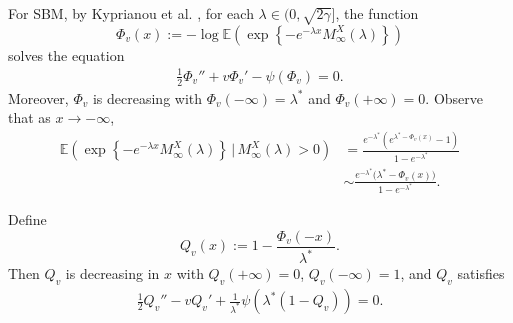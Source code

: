 \documentclass[11pt]{article}
\numberwithin{equation}{section}
\begin{document}
For SBM, by Kyprianou et al. \cite{KLMR12}, for each $\lambda \in (0, \sqrt{2\gamma}]$, the function
\[
\Phi_v(x) := -\log \mathbb{E}\left(\exp\left\{-e^{-\lambda x} M_\infty^X(\lambda)\right\}\right)
\]
solves the equation
\begin{align*}
	\frac{1}{2}\Phi_v'' + v \Phi_v' - \psi(\Phi_v) = 0.
\end{align*}
Moreover, $\Phi_v$ is decreasing with $\Phi_v(-\infty) = \lambda^*$ and $\Phi_v(+\infty) = 0$. 
Observe that as $x \to -\infty$, 
\begin{align}\label{Laplace-SBM}
	\mathbb{E}
	\left(\exp\left\{-e^{-\lambda x} M_\infty^X(\lambda)\right\} \,\Big|\, M_\infty^X(\lambda) > 0\right)
	& = \frac{e^{-\lambda^*}\left(e^{\lambda^* - \Phi_v(x)} - 1\right)}{1 - e^{-\lambda^*}} \nonumber\\
	&\sim \frac{e^{-\lambda^*}\bigl(\lambda^* - \Phi_v(x)\bigr)}{1 - e^{-\lambda^*}}
	.
\end{align}

Define
\[
Q_v(x) := 1 - \frac{\Phi_v(-x)}{\lambda^*}
.
\]
Then
 $Q_v$ is decreasing in $x$ with $Q_v(+\infty) = 0$, $Q_v(-\infty) = 1$, and $Q_v$ satisfies
\begin{align}\label{ODE2'}
	\frac{1}{2} Q_v'' - v Q_v' + 
	\frac{1}{\lambda^*}\psi(\lambda^*(1-Q_v))= 0.
\end{align}
\end{document}
